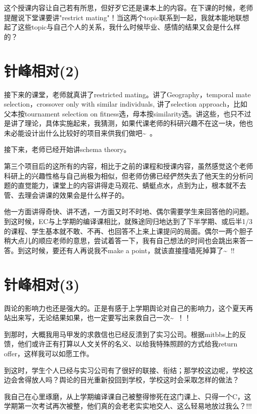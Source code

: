 \documentclass[12pt]{book}
\begin{document}
这个授课内容让自己若有所思，但好歹它还是课本上的内容。在下课的时候，老师提醒说下堂课要讲"restrict mating"！当这两个topic联系到一起，我就本能地联想起了这些topic与自己个人的关系，我什么时候毕业、感情的结果又会是什么样的？

\section{针峰相对(2)}
\label{sec-34-2}

接下来的课堂，老师就真讲了restricted mating。讲了Geography，temporal mate selection，crossover only with similar individuals, 讲了selection approach，比如父本按tournament selection on fitness选，母本按similarity选。讲这些，也只不过是讲了理论，具体实施起来，我猜测，如果代课老师的科研兴趣不在这一块，他也未必能设计出什么比较好的项目来供我们做吧\textasciitilde{}~。

接下来，老师已经开始讲schema theory。

第三个项目后的这所有的内容，相比于之前的课程和授课内容，虽然感觉这个老师科研上的兴趣性格与自己尚极为相似，但老师仿佛已经俨然失去了他天生的分析问题的直觉能力，课堂上的内容讲得走马观花、蜻蜓点水，点到为止，根本就不去管、去理会讲课的效果会是什么样子的。

他一方面讲得奇快、讲不透，一方面又时不时地、偶尔需要学生来回答他的问题。到这时候，EC与上学期的编译课相比，就殊途同归地达到了下半学期、或后半1/3的课程、学生基本就不敢、不再、也回答不上来上课提问的局面。偶尔一两个胆子稍大点儿的顺应老师的意思，尝试着答一下，我有自己想法的时间也会跳出来答一答。到这时候，要还有人再说我不make a point，就该直接撞墙死掉算了\textasciitilde{}~!!

\section{针峰相对(3)}
\label{sec-34-3}

舆论的影响力也还是强大的。正是有感于上学期舆论对自己的影响力，这个夏天再站出来写，无论结果如果，也一定要写出来救自己一次\textasciitilde{}~！！

到那时，大概我用马甲发的求救信也已经反溃到了实习公司。根据mitbbs上的反馈，他们或许正有打算以人文关怀的名义、以给我特殊照顾的方式给我return offer，这样我可以如愿工作。

到这时，学生个人已经与实习公司有了很好的联接、衔结；那学校这边呢，学校这边会舍得放人吗？舆论的目光重新投回到学校，学校这时会采取怎样的做法？

我自己在心里琢磨，从上学期编译课自己被整得惨死在这门课上、只得一个C，这学期第一次考试再次被整，他们真的会老老实实地交人、这么轻易地放过我么？!!!
\end{document}
